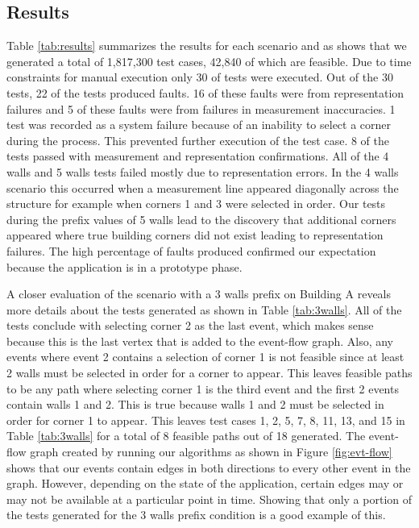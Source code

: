 \documentclass[final,3p]{CSP}
\begin{document}
\subsection{Results}
\noindent

Table \ref{tab:results} summarizes the results for each scenario and as shows that we generated a total of 1,817,300 test cases, 42,840 of which are feasible.  Due to time constraints for manual execution only 30 of tests were executed.  Out of the 30 tests, 22 of the tests produced faults.  16 of these faults were from representation failures and 5 of these faults were from failures in measurement inaccuracies.  1 test was recorded as a system failure because of an inability to select a corner during the process.  This prevented further execution of the test case. 8 of the tests passed with measurement and representation confirmations.   All of the 4 walls and 5 walls tests failed mostly due to representation errors.  In the 4 walls scenario this occurred when a measurement line appeared diagonally across the structure for example when corners 1 and 3 were selected in order.  Our tests during the prefix values of 5 walls lead to the discovery that additional corners appeared where true building corners did not exist leading to representation failures.  The high percentage of faults produced confirmed our expectation because the application is in a prototype phase.

A closer evaluation of the scenario with a 3 walls prefix on Building A reveals more details about the tests generated as shown in Table \ref{tab:3walls}.  All of the tests conclude with selecting corner 2 as the last event, which makes sense because this is the last vertex that is added to the event-flow graph.  Also, any events where event 2 contains a selection of corner 1 is not feasible since at least 2 walls must be selected in order for a corner to appear.  This leaves feasible paths to be any path where selecting corner 1 is the third event and the first 2 events contain walls 1 and 2.   This is true because walls 1 and 2 must be selected in order for corner 1 to appear.  This leaves test cases 1, 2, 5, 7, 8, 11, 13, and 15 in Table \ref{tab:3walls} for a total of 8 feasible paths out of 18 generated.  The event-flow graph created by running our algorithms as shown in Figure \ref{fig:evt-flow} shows that our events contain edges in both directions to every other event in the graph.  However, depending on the state of the application, certain edges may or may not be available at a particular point in time.  Showing that only a portion of the tests generated for the 3 walls prefix condition is a good example of this.
\end{document}
